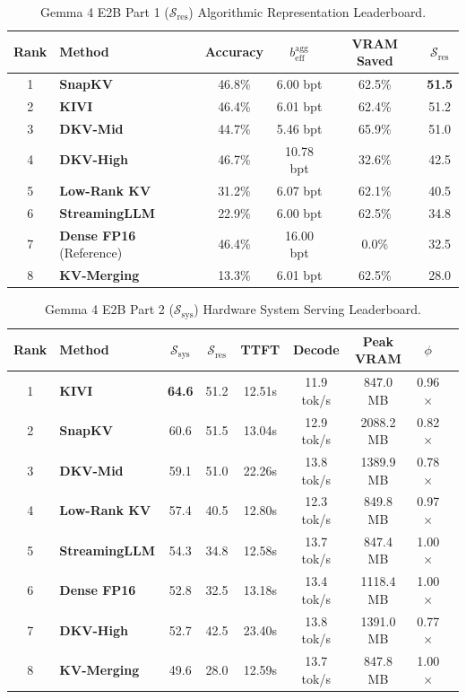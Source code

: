 \documentclass[10pt]{article}
\theoremstyle{definition}
\begin{document}
\begin{table}[h]
\vspace{6pt}
\centering
\small
\caption{Gemma 4 E2B Part 1 ($\mathcal{S}_{\text{res}}$) Algorithmic Representation Leaderboard.}
\label{tab:e2b_sres}
\begin{tabular}{clcccc}
\toprule
\textbf{Rank} & \textbf{Method} & \textbf{Accuracy} & $b_{\text{eff}}^{\text{agg}}$ & \textbf{VRAM Saved} & $\mathcal{S}_{\text{res}}$ \\
\midrule
1 & \textbf{SnapKV} & 46.8\% & 6.00 bpt & 62.5\% & \textbf{51.5} \\
2 & \textbf{KIVI} & 46.4\% & 6.01 bpt & 62.4\% & 51.2 \\
3 & \textbf{DKV-Mid} & 44.7\% & 5.46 bpt & 65.9\% & 51.0 \\
4 & \textbf{DKV-High} & 46.7\% & 10.78 bpt & 32.6\% & 42.5 \\
5 & \textbf{Low-Rank KV} & 31.2\% & 6.07 bpt & 62.1\% & 40.5 \\
6 & \textbf{StreamingLLM} & 22.9\% & 6.00 bpt & 62.5\% & 34.8 \\
7 & \textbf{Dense FP16} (Reference) & 46.4\% & 16.00 bpt & 0.0\% & 32.5 \\
8 & \textbf{KV-Merging} & 13.3\% & 6.01 bpt & 62.5\% & 28.0 \\
\bottomrule
\end{tabular}
\end{table}

\begin{table}[h]
\vspace{6pt}
\centering
\small
\caption{Gemma 4 E2B Part 2 ($\mathcal{S}_{\text{sys}}$) Hardware System Serving Leaderboard.}
\label{tab:e2b_ssys}
\begin{tabular}{clccccccc}
\toprule
\textbf{Rank} & \textbf{Method} & $\mathcal{S}_{\text{sys}}$ & $\mathcal{S}_{\text{res}}$ & \textbf{TTFT} & \textbf{Decode} & \textbf{Peak VRAM} & $\phi$ \\
\midrule
1 & \textbf{KIVI} & \textbf{64.6} & 51.2 & 12.51s & 11.9 tok/s & 847.0 MB & 0.96$\times$ \\
2 & \textbf{SnapKV} & 60.6 & 51.5 & 13.04s & 12.9 tok/s & 2088.2 MB & 0.82$\times$ \\
3 & \textbf{DKV-Mid} & 59.1 & 51.0 & 22.26s & 13.8 tok/s & 1389.9 MB & 0.78$\times$ \\
4 & \textbf{Low-Rank KV} & 57.4 & 40.5 & 12.80s & 12.3 tok/s & 849.8 MB & 0.97$\times$ \\
5 & \textbf{StreamingLLM} & 54.3 & 34.8 & 12.58s & 13.7 tok/s & 847.4 MB & 1.00$\times$ \\
6 & \textbf{Dense FP16} & 52.8 & 32.5 & 13.18s & 13.4 tok/s & 1118.4 MB & 1.00$\times$ \\
7 & \textbf{DKV-High} & 52.7 & 42.5 & 23.40s & 13.8 tok/s & 1391.0 MB & 0.77$\times$ \\
8 & \textbf{KV-Merging} & 49.6 & 28.0 & 12.59s & 13.7 tok/s & 847.8 MB & 1.00$\times$ \\
\bottomrule
\end{tabular}
\end{table}
\end{document}
